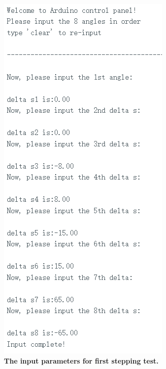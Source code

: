 \begin{figure}[H] %
    \centering %
    \captionsetup{labelsep=colon}
    \includegraphics[width=0.65\linewidth]{Image/Code-Display/arduino1.png}
    \caption[The input parameters for first stepping test]
    {\centering \textbf{The input parameters for first stepping test.}}
    \label{fig:arduino_code_display_1}
\end{figure}

